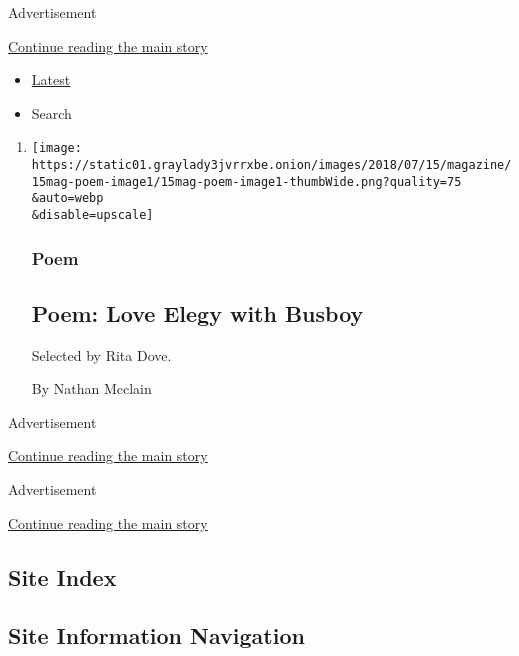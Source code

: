Advertisement

\protect\hyperlink{after-mid1}{Continue reading the main story}

\begin{itemize}
\tightlist
\item
  \protect\hyperlink{stream-panel}{Latest}
\item
  Search
\end{itemize}

\begin{enumerate}
\def\labelenumi{\arabic{enumi}.}
\item
  \href{/2018/07/17/magazine/poem-love-elegy-with-busboy.html}{}

  \texttt{[image: https://static01.graylady3jvrrxbe.onion/images/2018/07/15/magazine/15mag-poem-image1/15mag-poem-image1-thumbWide.png?quality=75\\\&auto=webp\\\&disable=upscale]}

  \hypertarget{poem}{%
  \subsubsection{Poem}\label{poem}}

  \hypertarget{poem-love-elegy-with-busboy}{%
  \subsection{Poem: Love Elegy with
  Busboy}\label{poem-love-elegy-with-busboy}}

  Selected by Rita Dove.

  By Nathan Mcclain
\end{enumerate}

Advertisement

\protect\hyperlink{after-mid2}{Continue reading the main story}

Advertisement

\protect\hyperlink{after-mktg}{Continue reading the main story}

\hypertarget{site-index}{%
\subsection{Site Index}\label{site-index}}

\hypertarget{site-information-navigation}{%
\subsection{Site Information
Navigation}\label{site-information-navigation}}

